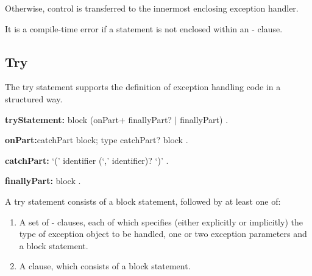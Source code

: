 \documentclass{article}
\newcommand{\code}[1]{{\sf #1}}
\begin{document}

\LMHash{}
Otherwise, control is transferred to the  innermost enclosing exception handler.


\LMHash{}
It is a compile-time error if a  \code{\RETHROW{}} statement is not enclosed within an \ON-\CATCH{} clause.



\subsection{ Try}

\LMHash{}
The try statement supports the definition of exception handling code in a structured way.

\begin{grammar}
{\bf tryStatement:}
      \TRY{} block (onPart+ finallyPart? $|$ finallyPart)
    .

 {\bf onPart:}catchPart block;
    \ON{} type catchPart? block
   .

{\bf catchPart:}
      \CATCH{} `(' identifier (`,' identifier)? `)'
    .

{\bf finallyPart:}
      \FINALLY{} block
    .
 \end{grammar}

\LMHash{}
 A try statement consists of a block statement, followed by at least one of:
 \begin{enumerate}
 \item
A set of \ON{}-\CATCH{} clauses, each of which specifies  (either explicitly or implicitly) the type of exception object to be handled, one or two exception parameters and a block statement.
\item
A \FINALLY{} clause, which consists of a block statement.
\end{enumerate}

\end{document}
